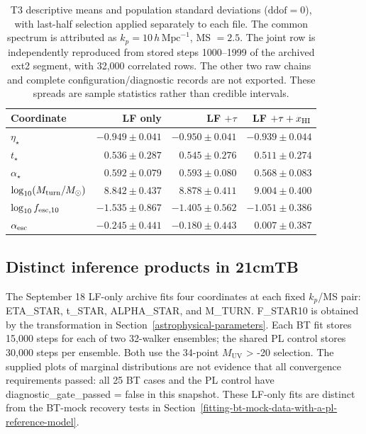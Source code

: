 \begin{table}[t]\centering\small
\caption{T3 descriptive means and population standard deviations ($\mathrm{ddof}=0$), with last-half selection applied separately to each file. The common spectrum is attributed as $k_p=10\,h\,\mathrm{Mpc}^{-1}$, MS $=2.5$. The joint row is independently reproduced from stored steps 1000--1999 of the archived ext2 segment, with 32,000 correlated rows. The other two raw chains and complete configuration/diagnostic records are not exported. These spreads are sample statistics rather than credible intervals.}\label{tab:t3-obs-combinations}
\begin{tabular*}{\textwidth}{@{\extracolsep{\fill}}lrrr}\toprule
Coordinate & LF only & LF $+\tau$ & LF $+\tau+x_{\rm HI}$\\\midrule
$\eta_\star$ & $-0.949\pm0.041$ & $-0.950\pm0.041$ & $-0.939\pm0.044$\\
$t_\star$ & $0.536\pm0.287$ & $0.545\pm0.276$ & $0.511\pm0.274$\\
$\alpha_\star$ & $0.592\pm0.079$ & $0.593\pm0.080$ & $0.568\pm0.083$\\
$\log_{10}(M_{\rm turn}/M_\odot)$ & $8.842\pm0.437$ & $8.878\pm0.411$ & $9.004\pm0.400$\\
$\log_{10}f_{{\rm esc},10}$ & $-1.535\pm0.867$ & $-1.405\pm0.562$ & $-1.051\pm0.386$\\
$\alpha_{\rm esc}$ & $-0.245\pm0.441$ & $-0.180\pm0.443$ & $0.007\pm0.387$\\
\bottomrule\end{tabular*}\end{table}

\subsection{Distinct inference products in 21cmTB}\label{distinct-inference-products-in-21cmtb}

The September 18 LF-only archive fits four coordinates at each fixed \ensuremath{k_p}/MS pair: ETA\_STAR, t\_STAR, ALPHA\_STAR, and M\_TURN. F\_STAR10 is obtained by the transformation in Section~\ref{astrophysical-parameters}. Each BT fit stores 15,000 steps for each of two 32-walker ensembles; the shared PL control stores 30,000 steps per ensemble. Both use the 34-point \ensuremath{M_{\mathrm{UV}}} \textgreater{} -20 selection. The supplied plots of marginal distributions are not evidence that all convergence requirements passed: all 25 BT cases and the PL control have diagnostic\_gate\_passed = false in this snapshot. These LF-only fits are distinct from the BT-mock recovery tests in Section~\ref{fitting-bt-mock-data-with-a-pl-reference-model}.

